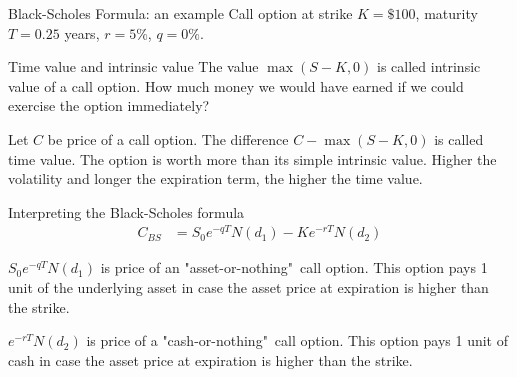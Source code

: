 \documentclass{beamer}
\begin{document}
\begin{frame}{Black-Scholes Formula: an example}
\justify
Call option at strike $K=\$100$, maturity $T=0.25$ years, $r=5\%$, $q=0\%$.

\centering
{}
\end{frame}



\begin{frame}{Time value and intrinsic value}
\justify
The value $\max(S - K, 0)$ is called \alert{intrinsic value} of a call option. How much money we would have earned if we could exercise the option immediately?

\justify
Let $C$ be price of a call option. The difference $C - \max(S - K, 0)$ is called \alert{time value}. The option is worth more than its simple intrinsic value. Higher the volatility and longer the expiration term, the higher the time value.
\end{frame}



\begin{frame}{Interpreting the Black-Scholes formula}
\begin{align*}
C_{BS} &= S_0e^{-qT}N(d_1) - Ke^{-rT}N(d_2)
\end{align*}

\justify
$S_0e^{-qT}N(d_1)$ is price of an "asset-or-nothing"\ call option. This option pays 1 unit of the underlying asset in case the asset price at expiration is higher than the strike.

\justify
$e^{-rT}N(d_2)$ is price of a "cash-or-nothing"\ call option. This option pays 1 unit of cash in case the asset price at expiration is higher than the strike.
\end{frame}
\end{document}
